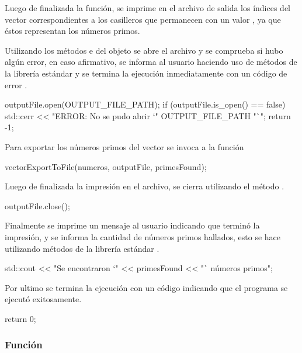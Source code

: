 \documentclass[12pt]{article}
\newenvironment{fullgrayverb}
{\verbbox}
{\endverbbox\par\colorbox{gray!25}{\parbox{\textwidth}{\theverbbox}}\par}
\begin{document}
Luego de finalizada la función, se imprime en el archivo de salida los índices
del vector correspondientes a los casilleros que permanecen con un valor
, ya que éstos representan los números primos.

Utilizando los métodos  e  del objeto
 se abre el archivo  y se comprueba si hubo
algún error, en caso afirmativo, se informa al usuario haciendo uso de métodos
de la librería estándar  y se termina la ejecución inmediatamente
con un código de error .

\begin{fullgrayverb}[\mbox{}]
outputFile.open(OUTPUT_FILE_PATH);
if (outputFile.is_open() == false) {
    std::cerr << "ERROR: No se pudo abrir `" OUTPUT_FILE_PATH "`\n";
    return -1;
}
\end{fullgrayverb}

Para exportar los números primos del vector se invoca a la función
\linebreak{}

\begin{fullgrayverb}[\mbox{}]
vectorExportToFile(numeros, outputFile, primesFound);
\end{fullgrayverb}

Luego de finalizada la impresión en el archivo, se cierra utilizando el método
.

\begin{fullgrayverb}[\mbox{}]
outputFile.close();
\end{fullgrayverb}

Finalmente se imprime un mensaje al usuario indicando que terminó la impresión,
y se informa la cantidad de números primos hallados, esto se hace utilizando
métodos de la librería estándar .

\begin{fullgrayverb}[\mbox{}]
std::cout << "Se encontraron `" << primesFound << "` números primos\n";
\end{fullgrayverb}

Por ultimo se termina la ejecución con un código  indicando que el
programa se ejecutó exitosamente.

\begin{fullgrayverb}[\mbox{}]
return 0;
\end{fullgrayverb}

\subsubsection{Función }
\end{document}
